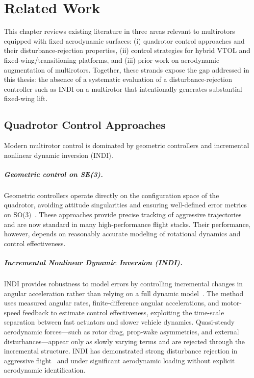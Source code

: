 
\chapter{Related Work}\label{chapter:related-work}

This chapter reviews existing literature in three areas relevant to multirotors equipped with fixed aerodynamic surfaces: (i) quadrotor control approaches and their disturbance-rejection properties, (ii) control strategies for hybrid VTOL and fixed-wing/transitioning platforms, and (iii) prior work on aerodynamic augmentation of multirotors. Together, these strands expose the gap addressed in this thesis: the absence of a systematic evaluation of a disturbance-rejection controller such as INDI on a multirotor that intentionally generates substantial fixed-wing lift.

\section{Quadrotor Control Approaches}

Modern multirotor control is dominated by geometric controllers and incremental nonlinear dynamic inversion (INDI).

\paragraph{Geometric control on SE(3).}
Geometric controllers operate directly on the configuration space of the quadrotor, avoiding attitude singularities and ensuring well-defined error metrics on SO(3)~\cite{Lee2010,Goodarzi2015}. These approaches provide precise tracking of aggressive trajectories and are now standard in many high-performance flight stacks. Their performance, however, depends on reasonably accurate modeling of rotational dynamics and control effectiveness.

\paragraph{Incremental Nonlinear Dynamic Inversion (INDI).}
INDI provides robustness to model errors by controlling incremental changes in angular acceleration rather than relying on a full dynamic model~\cite{Sieberling2010,Smeur2016}. The method uses measured angular rates, finite-difference angular accelerations, and motor-speed feedback to estimate control effectiveness, exploiting the time-scale separation between fast actuators and slower vehicle dynamics. Quasi-steady aerodynamic forces---such as rotor drag, prop-wake asymmetries, and external disturbances---appear only as slowly varying terms and are rejected through the incremental structure. INDI has demonstrated strong disturbance rejection in aggressive flight~\cite{Tzoumanikas2021} and under significant aerodynamic loading without explicit aerodynamic identification.

